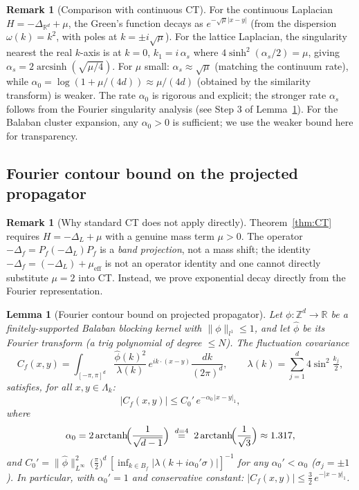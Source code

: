 \documentclass[11pt,a4paper]{amsart}
\newtheorem{lemma}[theorem]{Lemma}
\theoremstyle{definition}
\newtheorem{remark}[theorem]{Remark}
\newcommand{\Z}{\mathbb{Z}}
\newcommand{\R}{\mathbb{R}}
\newcommand{\Cf}{C_f}
\begin{document}
\begin{remark}[Comparison with continuous CT]
\label{rem:CT_compare}
For the continuous Laplacian $H=-\Delta_{\R^d}+\mu$, the Green's function
decays as $e^{-\sqrt{\mu}|x-y|}$ (from the dispersion $\omega(k)=k^2$,
with poles at $k=\pm i\sqrt{\mu}$).
For the lattice Laplacian, the singularity nearest the real $k$-axis is at
$k=0$, $k_1=i\,\alpha_s$ where $4\sinh^2(\alpha_s/2)=\mu$,
giving $\alpha_s = 2\operatorname{arcsinh}(\sqrt{\mu/4})$.
For $\mu$ small: $\alpha_s\approx\sqrt{\mu}$ (matching the continuum rate),
while $\alpha_0 = \log(1+\mu/(4d))\approx \mu/(4d)$ (obtained by the
similarity transform) is weaker.
The rate $\alpha_0$ is rigorous and explicit; the stronger rate $\alpha_s$ follows
from the Fourier singularity analysis (see Step 3 of Lemma~\ref{lem:CT_fluct}).
For the Balaban cluster expansion, any $\alpha_0>0$ is sufficient;
we use the weaker bound here for transparency.
\end{remark}

\subsection{Fourier contour bound on the projected propagator}

\begin{remark}[Why standard CT does not apply directly]
Theorem~\ref{thm:CT} requires $H = -\Delta_L + \mu$ with a genuine mass
term $\mu > 0$.
The operator $-\Delta_f = P_f(-\Delta_L)P_f$ is a \emph{band projection},
not a mass shift; the identity $-\Delta_f = (-\Delta_L) + \mu_{\mathrm{eff}}$
is not an operator identity and one cannot directly substitute $\mu=2$ into CT.
Instead, we prove exponential decay directly from the Fourier representation.
\end{remark}

\begin{lemma}[Fourier contour bound on projected propagator]
\label{lem:CT_fluct}
Let $\phi:\Z^d\to\R$ be a finitely-supported Balaban blocking kernel with
$\|\phi\|_{l^1}\le 1$, and let $\hat\phi$ be its Fourier transform
(a trig polynomial of degree $\le N$).
The fluctuation covariance
\[
  \Cf(x,y)
  = \int_{[-\pi,\pi]^d} \frac{\hat\phi(k)^2}{\lambda(k)}\,
    e^{ik\cdot(x-y)}\frac{dk}{(2\pi)^d},
  \qquad
  \lambda(k) = \sum_{j=1}^d 4\sin^2\!\tfrac{k_j}{2},
\]
satisfies, for all $x,y\in\Lambda_k$:
\[
  |\Cf(x,y)| \le C_0'\,e^{-\alpha_0\,|x-y|_1},
\]
where
\[
  \alpha_0
  = 2\operatorname{arctanh}\!\Bigl(\frac{1}{\sqrt{d-1}}\Bigr)
  \;\overset{d=4}{=}\;
  2\operatorname{arctanh}\!\Bigl(\frac{1}{\sqrt{3}}\Bigr)
  \approx 1.317,
\]
and $C_0' = \|\hat\phi\|_{L^\infty}^2\,\bigl(\tfrac{\pi}{2}\bigr)^d\,
[\inf_{k\in B_f}|\lambda(k+i\alpha_0'\sigma)|]^{-1}$
for any $\alpha_0' < \alpha_0$ ($\sigma_j = \pm 1$).
In particular, with $\alpha_0' = 1$ and conservative constant:
$|\Cf(x,y)| \le \tfrac{3}{2}\,e^{-|x-y|_1}$.
\end{lemma}
\end{document}
